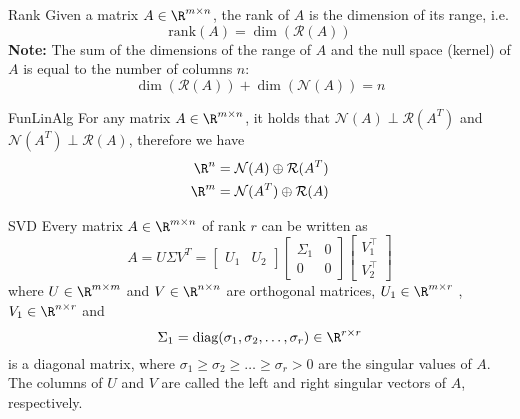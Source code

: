 \newpage

\begin{theo}[Rank]{Rank}
    Given a matrix $A \in \R^{m \times n}$, the rank of $A$ is the dimension of its range, i\@.e\@.
    \begin{equation*}
        \text{rank}(A) = \dim(\mathcal{R}(A))
    \end{equation*}
    \textbf{Note:} The sum of the dimensions of the range of $A$ and the null space (kernel) of $A$ is equal to the number of columns $n$:
    \begin{equation*}
        \dim(\mathcal{R}(A)) + \dim(\mathcal{N}(A)) = n
    \end{equation*}
    \vspace{-0.5cm}
\end{theo}

\begin{theo}{FunLinAlg}
    For any matrix $A \in \R^{m \times n}$, it holds that $\mathcal{N}(A) \perp \mathcal{R}(A^T)$ and $\mathcal{N}(A^T) \perp \mathcal{R}(A)$, therefore we have 
    \begin{align*}
        \R^n &= \mathcal{N}(A) \oplus \mathcal{R}(A^T) \\
        \R^m &= \mathcal{N}(A^T) \oplus \mathcal{R}(A)
    \end{align*}
    \vspace*{-0.5cm}
\end{theo}

\begin{theo}{SVD}
    Every matrix $A \in \R^{m \times n}$ of rank $r$ can be written as
    \begin{equation*}
        A = U \Sigma V^T = \left[
            \begin{array}{cc}
            U_1 & U_2
            \end{array}
            \right]
            \left[
            \begin{array}{cc}
            \Sigma_1 & 0 \\
            0 & 0
            \end{array}
            \right]
            \left[
            \begin{array}{c}
            V_1^\top \\
            V_2^\top
            \end{array}
            \right]
    \end{equation*}
    where $U \in \R^{m \times m}$ and $V \in \R^{n \times n}$ are orthogonal matrices, $U_1 \in \R^{m \times r}$ , $V_1 \in \R^{n \times r}$ and 
    \begin{equation*}
        \Sigma_1 = \text{diag}(\sigma_1, \sigma_2, \ldots, \sigma_r) \in \R^{r \times r}
    \end{equation*}
    is a diagonal matrix, where $\sigma_1 \geq \sigma_2 \geq \ldots \geq \sigma_r > 0$ are the singular values of $A$. The columns of $U$ and $V$ are called the left and right singular vectors of $A$, respectively.
\end{theo}


